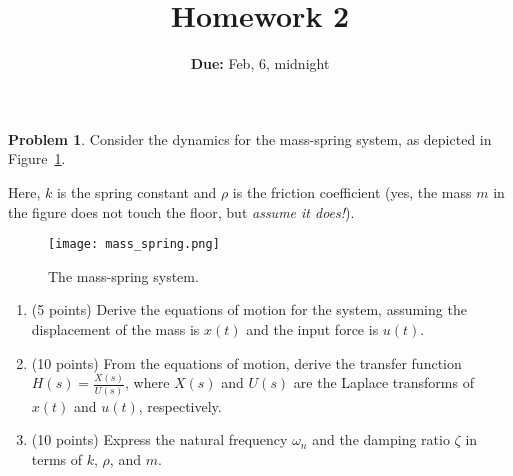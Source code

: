 \documentclass{article}
\theoremstyle{definition}
\newtheorem{problem}{Problem}
\begin{document}
\title{Homework 2}
\author{{\bf Due:} Feb, 6, midnight}
\date{}
\maketitle

\begin{problem}
Consider the dynamics for the mass-spring system, as depicted in 
Figure~\ref{fig:mass_spring}. 

\vspace{12pt}

\noindent  Here, $k$ is the spring constant and $\rho$ is the friction 
coefficient (yes, the mass $m$ in the figure does not touch the floor, but \textit{assume it does!}).

\vspace{12pt}

\begin{figure}[!ht]
 	\begin{center}
 	\texttt{[image: mass\_spring.png]}
 	\end{center}
 	\caption{The mass-spring system.}
 	\label{fig:mass_spring}
\end{figure}

\begin{enumerate}[label=(\alph*), noitemsep] 
\item (5 points) Derive the equations of motion for the system, 
assuming the displacement of the mass is \( x(t) \) and the input 
force is \( u(t) \).  

\item (10 points) From the equations of motion, derive the transfer 
function \( H(s) = \frac{X(s)}{U(s)} \), where \( X(s) \) and \( U(s) \) 
are the Laplace transforms of \( x(t) \) and \( u(t) \), respectively.  

\item (10 points) Express the natural frequency \( \omega_n \) and 
the damping ratio \( \zeta \) in terms of \( k \), \( \rho \), and \( m \).  

\end{enumerate}
\end{problem}
\end{document}
